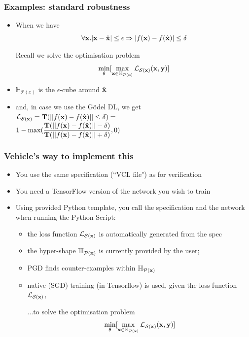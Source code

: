 \documentclass[t,compress,aspectratio=169]{beamer}
\newcommand{\translation}{\mathbf{T}}
\newcommand{\xs}{\x} 			%
\begin{document}
\begin{frame}[fragile]
\frametitle{Examples: standard robustness}

\begin{itemize}
\item When we have $$\forall \xs. |\xs - \xt| \leq \epsilon \Rightarrow |f(\x) - f(\hat{\x})| \leq \delta$$

\begin{block}{Recall we solve the optimisation problem}
$$\min_{\theta} [ \max_{\xs \in \mathbb{H}_{\mathcal{P}(\xs)}} \lossfn_{\mathcal{S}(\xs)}(\xs, \y)]$$
\end{block}

\item $\mathbb{H}_{\mathcal{P}(x)}$ is the $\epsilon$-cube around $\hat{\mathbf{x}}$

\item and, in case we use the G\"{o}del DL, we get \\
 $\lossfn_{\mathcal{S}(\xs)} = \large{\translation ( || f(\x) - f(\hat{\x})|| \leq \delta) }= $\\ $1 - \max(\dfrac{\translation(|| f(\x) - f(\hat{\x})|| - \delta)}{\translation (|| f(\x) - f(\hat{\x})|| + \delta)},0) $

\end{itemize}

\end{frame}

\begin{frame}[fragile]
\frametitle{Vehicle's way to implement this}

\begin{itemize}[<+->]
\item You use the same specification (``VCL file") as for verification
\item You need a TensorFlow version of the network you wish to train
\item Using provided Python template, you call the specification and the network when running the Python Script:

\begin{itemize}[<+->]
\item the loss function $\lossfn_{\mathcal{S}(\xs)}$ is automatically generated from the spec
\item the hyper-shape  $\mathbb{H}_{\mathcal{P}(\xs)} $ is currently provided by the user;
\item PGD finds counter-examples within $\mathbb{H}_{\mathcal{P}(\xs)} $
\item native (SGD) training (in Tensorflow) is used, given the loss function $\lossfn_{\mathcal{S}(\xs)}$,
\begin{block}{...to solve the optimisation problem}
$$\min_{\theta} [ \max_{\xs \in \mathbb{H}_{\mathcal{P}(\xs)}} \lossfn_{\mathcal{S}(\xs)}(\xs, \y)]$$
\end{block}
\end{itemize}

\end{itemize}


\end{frame}
\end{document}

